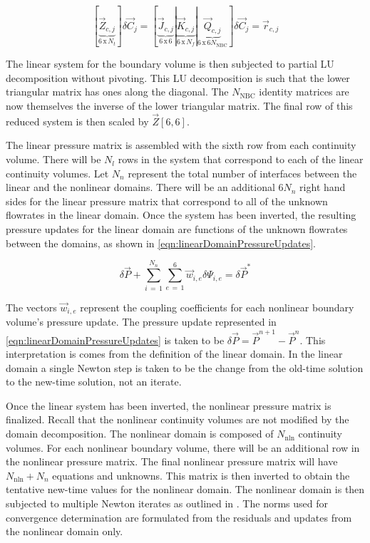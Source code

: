 \begin{equation}
\label{eqn:nbcLinSystem}
\left[\right.\underbrace{\vec{Z}_{c, j}}_{6\, \text{x}\, N_{t}}\left.\right] \delta \vec{C}_{j} = \left[\right.\underbrace{\vec{J}_{c, j}}_{6\, \text{x}\, 6}|\underbrace{\vec{K}_{c, j}}_{6\, \text{x}\, N_{f}}|{\underbrace{\vec{Q}_{c, j}}_{6\, \text{x}\, 6 N_{\text{NBC}}}}\left.\right]\delta \vec{C}_{j} = \vec{r}_{c,j}
\end{equation}

The linear system for the boundary volume is then subjected to partial LU decomposition without pivoting.
This LU decomposition is such that the lower triangular matrix has ones along the diagonal.
The $N_{\text{NBC}}$ identity matrices are now themselves the inverse of the lower triangular matrix.
The final row of this reduced system is then scaled by $\vec{Z}[6,6]$.

The linear pressure matrix is assembled with the sixth row from each continuity volume.
There will be $N_{l}$ rows in the system that correspond to each of the linear continuity volumes.
Let $N_{n}$ represent the total number of interfaces between the linear and the nonlinear domains.
There will be an additional $6 N_{n}$ right hand sides for the linear pressure matrix that correspond to all of the unknown flowrates in the linear domain.
Once the system has been inverted, the resulting pressure updates for the linear domain are functions of the unknown flowrates between the domains, as shown in \eqref{eqn:linearDomainPressureUpdates}.

\begin{equation}
\label{eqn:linearDomainPressureUpdates}
\delta \vec{P} + \sum_{i\,=\,1}^{N_{n}} \sum_{e\,=\,1}^{6} \vec{w}_{i, e} \delta \Psi_{i, e} = \delta \vec{P}^{*} 
\end{equation}

The vectors $\vec{w}_{i, e}$ represent the coupling coefficients for each nonlinear boundary volume's pressure update.
The pressure update represented in \eqref{eqn:linearDomainPressureUpdates} is taken to be $\delta \vec{P} = \vec{P}^{n+1} - \vec{P}^{n}$.
This interpretation is comes from the definition of the linear domain.
In the linear domain a single Newton step is taken to be the change from the old-time solution to the new-time solution, not an iterate.

Once the linear system has been inverted, the nonlinear pressure matrix is finalized.
Recall that the nonlinear continuity volumes are not modified by the domain decomposition.
The nonlinear domain is composed of $N_{\text{nln}}$ continuity volumes.
For each nonlinear boundary volume, there will be an additional row in the nonlinear pressure matrix.
The final nonlinear pressure matrix will have $N_{\text{nln}} + N_{n}$ equations and unknowns.
This matrix is then inverted to obtain the tentative new-time values for the nonlinear domain.
The nonlinear domain is then subjected to multiple Newton iterates as outlined in .
The norms used for convergence determination are formulated from the residuals and updates from the nonlinear domain only.

